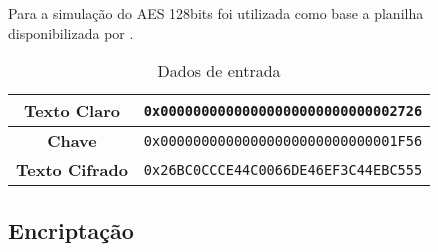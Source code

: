 \documentclass[
    article,            %
    11pt,               %
    oneside,            %
    a4paper,            %
    english,            %
    brazil,             %
    sumario=tradicional,
    ]{abntex2}
\begin{document}
Para a simulação do AES 128bits foi utilizada como base a planilha disponibilizada por \cite{aes_excel}.

\begin{table}[H]
\centering
\caption{Dados de entrada}
\label{table-input-data}
\begin{tabular}{|c|c|}
\hline
\cellcolor[HTML]{C0C0C0}\textbf{Texto Claro}   & \texttt{0x00000000000000000000000000002726}  \\ \hline
\cellcolor[HTML]{C0C0C0}\textbf{Chave}         & \texttt{0x00000000000000000000000000001F56}  \\ \hline
\cellcolor[HTML]{C0C0C0}\textbf{Texto Cifrado} & \texttt{0x26BC0CCCE44C0066DE46EF3C44EBC555}  \\ \hline
\end{tabular}
\end{table}

\subsection{\textbf{Encriptação}}
\end{document}

